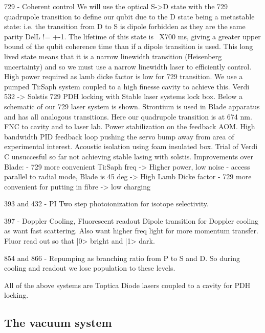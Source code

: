 \documentclass[12pt]{iopart}
\begin{document}
729 - Coherent control
We will use the optical S->D state with the 729 quadrupole transition
to define our qubit due to the D state being a metastable state:
i.e. the transition from D to S is dipole forbidden as they are the
same parity DelL != +-1. The lifetime of this state is ~X700 ms,
giving a greater upper bound of the qubit coherence time than if a
dipole transition is used. This long lived state means that it is a
narrow linewidth transition (Heisenberg uncertainty) and so we must
use a narrow linewidth laser to efficiently control.  High power
required as lamb dicke factor is low for 729 transition.  We use a
pumped Ti:Saph system coupled to a high finesse cavity to achieve
this.  Verdi 532 -> Solstis 729 PDH locking with Stable laser systems
lock box. Below a schematic of our 729 laser system is
shown. Strontium is used in Blade apparatus and has all analogous
transitions. Here our quadrupole transition is at 674 nm.  FNC to
cavity and to laser lab. Power stabilization on the feedback AOM. High
bandwidth PID feedback loop pushing the servo bump away from area of
experimental interest. Acoustic isolation using foam insulated box.
Trial of Verdi C unsuccesful so far not achieving stable lasing with
solstis.
Improvements over Blade:
- 729 more convenient Ti:Saph freq -> Higher power, low noise
- access parallel to radial mode, Blade is 45 deg -> High Lamb Dicke
factor
- 729 more convenient for putting in fibre -> low charging


393 and 432 - PI 
Two step photoionization for isotope selectivity.

397 - Doppler Cooling, Fluorescent readout
Dipole transition for Doppler cooling as want fast scattering. Also
want higher freq light for more momentum transfer.
Fluor read out so that |0> bright and |1> dark.

854 and 866 - Repumping as branching ratio from P to S and D. So
during cooling and readout we lose population to these levels.

All of the above systems are Toptica Diode lasers coupled to a cavity
for PDH locking.


\subsection{The vacuum system}
\end{document}
